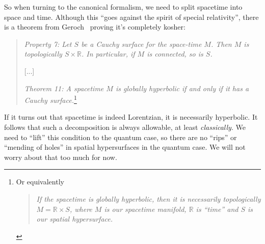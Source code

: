 So when turning to the canonical formalism, we need to split
spacetime into space and time. Although this ``goes against the
spirit of special relativity'', there is a theorem from Geroch~\cite{geroch1970dd}
proving it's completely kosher:
\begin{quotation}
\textit{Property 7: Let $S$ be a Cauchy surface for the
  space-time $M$. Then $M$ is topologically
  $S\times\mathbb{R}$. In particular, if $M$ is connected, so is
  $S$.}

[...]

\noindent\textit{Theorem 11: A spacetime $M$ is globally hyperbolic if and
  only if it has a Cauchy surface.}\footnote{Or equivalently\begin{quote}\textit{If the spacetime is globally hyperbolic, then it is
  necessarily topologically $M=\mathbb{R}\times S$, where $M$
  is our spacetime manifold, $\mathbb{R}$ is ``time'' and
  $S$ is our spatial hypersurface.}\end{quote}}
\end{quotation}
If it turns out that spacetime is indeed Lorentzian, it is
necessarily hyperbolic. It follows that such a decomposition is
always allowable, at least \emph{classically}. We need to
``lift'' this condition to the quantum case, so there are no
``rips'' or ``mending of holes'' in spatial hypersurfaces in the
quantum case. We will not worry about that too much for now.

